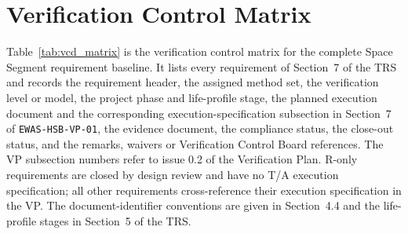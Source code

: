 \section{Verification Control Matrix}

Table~\ref{tab:vcd_matrix} is the verification control matrix for the complete Space Segment requirement baseline. It lists every requirement of Section~7 of the TRS and records the requirement header, the assigned method set, the verification level or model, the project phase and life-profile stage, the planned execution document and the corresponding execution-specification subsection in Section~7 of \texttt{EWAS-HSB-VP-01}, the evidence document, the compliance status, the close-out status, and the remarks, waivers or Verification Control Board references. The VP subsection numbers refer to issue 0.2 of the Verification Plan. R-only requirements are closed by design review and have no T/A execution specification; all other requirements cross-reference their execution specification in the VP. The document-identifier conventions are given in Section~4.4 and the life-profile stages in Section~5 of the TRS.


